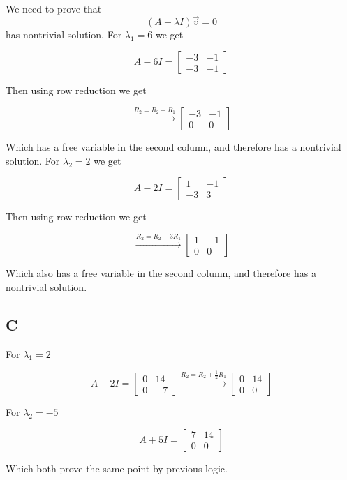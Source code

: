 \documentclass{article}
\begin{document}
We need to prove that
\[
	(A- \lambda I) \vec{v} = 0
\]
has nontrivial solution. For \(\lambda_1 = 6\) we get

\[
	A- 6I=
	\begin{bmatrix}
		-3 & -1 \\
		-3 & -1
	\end{bmatrix}
\]

Then using row reduction we get

\[
	\xrightarrow{R_2 = R_2 - R_1}
	\begin{bmatrix}
		-3 & -1 \\
		0  & 0
	\end{bmatrix}
\]

Which has a free variable in the second column, and therefore has a nontrivial solution. For \(\lambda_2 = 2\) we get

\[
	A- 2I=
	\begin{bmatrix}
		1  & -1 \\
		-3 & 3
	\end{bmatrix}
\]

Then using row reduction we get

\[
	\xrightarrow{R_2 = R_2 + 3R_1}
	\begin{bmatrix}
		1 & -1 \\
		0 & 0
	\end{bmatrix}
\]

Which also has a free variable in the second column, and therefore has a nontrivial solution.

\subsection*{C}

For \(\lambda_1 = 2\)

\[
	A - 2I =
	\begin{bmatrix}
		0 & 14 \\
		0 & -7
	\end{bmatrix}
	\xrightarrow{R_2 = R_2 + \frac{1}{2}R_1}
	\begin{bmatrix}
		0 & 14 \\
		0 & 0
	\end{bmatrix}
\]

For \(\lambda_2 = -5\)

\[
	A + 5I =
	\begin{bmatrix}
		7 & 14 \\
		0 & 0
	\end{bmatrix}
\]

Which both prove the same point by previous logic.
\end{document}
